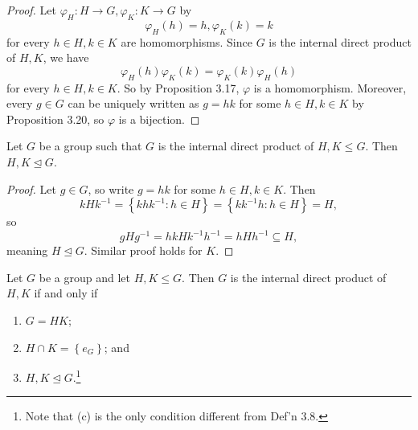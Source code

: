 \documentclass[pmath347]{subfiles}
\begin{document}
    \begin{proof}
        Let $\varphi_H:H\to G, \varphi_K:K\to G$ by
        \begin{equation*}
            \varphi_H\left( h \right) = h, \varphi_K\left( k \right) = k
        \end{equation*}
        for every $h\in H, k\in K$ are homomorphisms. Since $G$ is the internal direct product of $H,K$, we have
        \begin{equation*}
            \varphi_H\left( h \right) \varphi_K\left( k \right) = \varphi_K\left( k \right) \varphi_H\left( h \right) 
        \end{equation*}
        for every $h\in H, k\in K$. So by Proposition 3.17, $\varphi$ is a homomorphism. Moreover, every $g\in G$ can be uniquely written as $g=hk$ for some $h\in H, k\in K$ by Proposition 3.20, so $\varphi$ is a bijection.
    \end{proof}
    
    \begin{prop}{}
        Let $G$ be a group such that $G$ is the internal direct product of $H,K\leq G$. Then $H,K\trianglelefteq G$.
    \end{prop}

    \begin{proof}
        Let $g\in G$, so write $g=hk$ for some $h\in H, k\in K$. Then
        \begin{equation*}
            kHk^{-1} = \left\lbrace khk^{-1} :h\in H \right\rbrace = \left\lbrace kk^{-1} h:h\in H \right\rbrace = H,
        \end{equation*}
        so 
        \begin{equation*}
            gHg^{-1} = hkHk^{-1} h^{-1} = hHh^{-1} \subseteq H,
        \end{equation*}
        meaning $H\trianglelefteq G$. Similar proof holds for $K$.
    \end{proof}
    
    \clearpage
    \begin{prop}{}
        Let $G$ be a group and let $H,K\leq G$. Then $G$ is the internal direct product of $H,K$ if and only if
        \begin{enumerate}
            \item $G=HK$;
            \item $H\cap K=\left\lbrace e_G \right\rbrace$; and
            \item $H,K\trianglelefteq G$.\footnote{Note that (c) is the only condition different from Def'n 3.8.}
        \end{enumerate}
    \end{prop}
\end{document}
